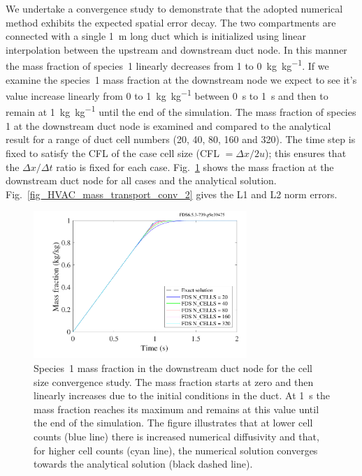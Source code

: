 \documentclass[11pt]{book}
\begin{document}
We undertake a convergence study to demonstrate that the adopted numerical method exhibits the expected spatial error decay. The two compartments are connected with a single \SI{1}{\meter} long duct which is initialized using linear interpolation between the upstream and downstream duct node. In this manner the mass fraction of species~1 linearly decreases from \num{1} to \SI[per-mode=symbol]{0}{\kilogram\per\kilogram}. If we examine the species~1 mass fraction at the downstream node we expect to see it's value increase linearly from \num{0} to \SI[per-mode=symbol]{1}{\kilogram\per\kilogram} between \SI{0}{\second} to \SI{1}{\second} and then to remain at \SI[per-mode=symbol]{1}{\kilogram\per\kilogram} until the end of the simulation. The mass fraction of species 1 at the downstream duct node is examined and compared to the analytical result for a range of duct cell numbers (20, 40, 80, 160 and 320). The time step is fixed to satisfy the CFL of the case cell size (CFL \(= \Delta x/2u\)); this ensures that the \(\Delta x/\Delta t\) ratio is fixed for each case. Fig.~\ref{fig_HVAC_mass_transport_conv_1} shows the mass fraction at the downstream duct node for all cases and the analytical solution. Fig.~\ref{fig_HVAC_mass_transport_conv_2} gives the L1 and L2 norm errors.

\begin{figure}[ht]
\centering
\includegraphics[height=2.2in]{SCRIPT_FIGURES/HVAC_mass_transport_convergence_1}
\caption[ test case result]{Species~\num{1} mass fraction in the downstream duct node for the cell size convergence study. The mass fraction starts at zero and then linearly increases due to the initial conditions in the duct. At \SI{1}{\second} the mass fraction reaches its maximum and remains at this value until the end of the simulation. The figure illustrates that at lower cell counts (blue line) there is increased numerical diffusivity and that, for higher cell counts (cyan line), the numerical solution converges towards the analytical solution (black dashed line).}
\label{fig_HVAC_mass_transport_conv_1}
\end{figure}
\end{document}
